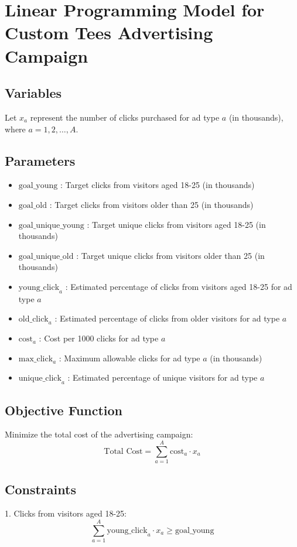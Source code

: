 \documentclass{article}
\begin{document}
\section*{Linear Programming Model for Custom Tees Advertising Campaign}

\subsection*{Variables}
Let \( x_a \) represent the number of clicks purchased for ad type \( a \) (in thousands), where \( a = 1, 2, \ldots, A \).

\subsection*{Parameters}
\begin{itemize}
    \item \( \text{goal\_young} \) : Target clicks from visitors aged 18-25 (in thousands)
    \item \( \text{goal\_old} \) : Target clicks from visitors older than 25 (in thousands)
    \item \( \text{goal\_unique\_young} \) : Target unique clicks from visitors aged 18-25 (in thousands)
    \item \( \text{goal\_unique\_old} \) : Target unique clicks from visitors older than 25 (in thousands)
    \item \( \text{young\_click}_{a} \) : Estimated percentage of clicks from visitors aged 18-25 for ad type \( a \)
    \item \( \text{old\_click}_{a} \) : Estimated percentage of clicks from older visitors for ad type \( a \)
    \item \( \text{cost}_{a} \) : Cost per 1000 clicks for ad type \( a \)
    \item \( \text{max\_click}_{a} \) : Maximum allowable clicks for ad type \( a \) (in thousands)
    \item \( \text{unique\_click}_{a} \) : Estimated percentage of unique visitors for ad type \( a \)
\end{itemize}

\subsection*{Objective Function}
Minimize the total cost of the advertising campaign:
\[
\text{Total Cost} = \sum_{a=1}^{A} \text{cost}_{a} \cdot x_a
\]

\subsection*{Constraints}
1. Clicks from visitors aged 18-25:
\[
\sum_{a=1}^{A} \text{young\_click}_{a} \cdot x_a \geq \text{goal\_young}
\]
\end{document}
